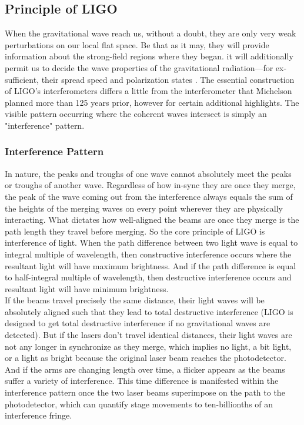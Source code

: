 \subsection{Principle of LIGO}

When the gravitational wave reach us, without a doubt, they are only very weak perturbations on our local flat space. Be that as it may, they will provide information about the strong-field regions where they began. it will additionally permit us to decide the wave properties of the gravitational radiation—for ex-sufficient, their spread speed and polarization states \cite{barish1999ligo}. The essential construction of LIGO's interferometers differs a little from the interferometer that Michelson planned more than 125 years prior, however for certain additional highlights. The visible pattern occurring where the coherent waves intersect is simply an "interference" pattern.\cite{collaboration2015advanced}

\subsubsection{Interference Pattern}

In  nature,  the  peaks  and  troughs  of  one  wave cannot absolutely  meet  the  peaks or  troughs  of  another  wave. Regardless  of  how in-sync they are once they merge, the peak of the wave coming out from the interference always equals the sum of the heights of the merging waves on every point wherever they are physically interacting. What  dictates how  well-aligned  the  beams are once  they  merge  is  the path length  they travel before merging. So the core principle of LIGO is interference of light. When the path difference between two light wave is equal to integral multiple of wavelength, then constructive interference occurs where the resultant light will have maximum brightness. And if the path difference is equal to half-integral multiple of wavelength, then destructive interference occurs and resultant light will have minimum brightness. \\

If the beams travel precisely the same distance, their light waves will be absolutely aligned such that they lead to total destructive interference (LIGO is designed to get total destructive interference if no gravitational waves are detected).  But if the lasers don’t travel identical distances, their light waves are not any longer in synchronize as they merge, which implies no light, a bit light, or a light as bright because the original laser beam reaches the photodetector.  And if the arms are changing length over time, a flicker appears as the beams suffer a variety of interference. This time difference is manifested within the interference pattern once the two laser beams superimpose on the path to the photodetector, which can quantify stage movements to ten-billionths of an interference fringe.\cite{barish1999ligo}\\

